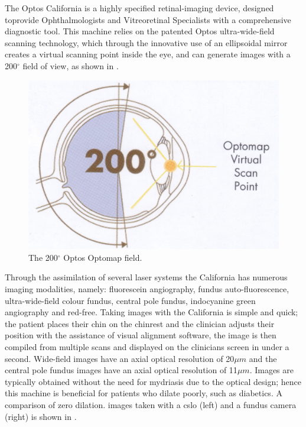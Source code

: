 The Optos California is a highly specified retinal-imaging device,
designed toprovide Ophthalmologists and Vitreoretinal Specialists
with a comprehensive diagnostic tool. This machine relies on the
patented Optos ultra-wide-field scanning technology, which through
the innovative use of an ellipsoidal mirror creates a virtual scanning
point inside the eye, and can generate images with a 200$^\circ$ field
of view, as shown in . 

\begin{figure}[H]
\centering
\includegraphics{figures/optoswide}
\caption{The 200$^\circ$ Optos Optomap field.\cite{1_optos.com_2015}}
\label{fig:wideview}
   \end{figure}

Through the assimilation of several \gls{laser} systems the California
has numerous imaging modalities, namely: fluorescein angiography,
fundus auto-fluorescence, ultra-wide-field colour fundus, central pole
fundus, indocyanine green angiography and red-free.\cite{7_burnett_hodd_2012} Taking images with the California is simple and quick; the patient places
their chin on the chinrest and the clinician adjusts their position with the
assistance of visual alignment software, the image is then compiled
from multiple scans and displayed on the clinicians screen in under a second. Wide-field images have an axial optical resolution of 20$\mu m$ and the
central pole fundus images have an axial optical resolution of
11$\mu m$. Images are typically obtained without the need for mydriasis
due to the optical design; hence this machine is beneficial for patients who
dilate poorly, such as diabetics. A comparison of zero dilation.\cite{11_de_brouwere_2013} images taken with a \gls{cslo} (left)
and a fundus camera (right) is shown in . 

